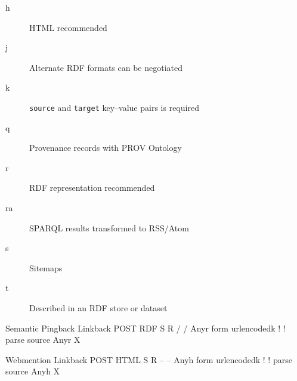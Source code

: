                                                     
                                                    \begin{description}
  \item[h] HTML recommended\item[j] Alternate RDF formats can be negotiated\item[k] {\tt source} and {\tt target} key–value pairs is required\item[q] Provenance records with \empty PROV Ontology\item[r] RDF representation recommended\item[ra] SPARQL results transformed to RSS/Atom\item[s] \empty Sitemaps\item[t] Described in an RDF store or dataset
    \end{description}
  
                                                
                                                
                                            
                                        
                                        
                                            
                                                Semantic Pingback
                                                Linkback
                                                POST
                                                RDF
                                                S R
                                                /
                                                /
                                                Anyr
                                                form urlencodedk
                                                !
                                                ! parse source
                                                Anyr
                                                X
                                            
                                            
                                                Webmention
                                                Linkback
                                                POST
                                                HTML
                                                S R
                                                –
                                                –
                                                Anyh
                                                form urlencodedk
                                                !
                                                ! parse source
                                                Anyh
                                                X
                                            

